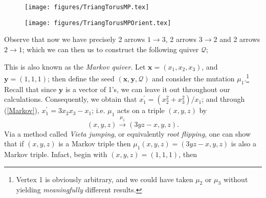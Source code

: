 \begin{figure}[!htb]
\centering
{}
\footnotesize
\texttt{[image: figures/TriangTorusMP.tex]}
\endminipage\hfill
{}
\centering
\footnotesize
{}
\endminipage\hfill
{}%
\footnotesize
\texttt{[image: figures/TriangTorusMPOrient.tex]}
\endminipage
\end{figure}
Observe that now we have precisely 2 arrows $1 \rightarrow 3$, 2 arrows $3 \rightarrow 2$ and 2 arrows $2 \rightarrow 1$; which we can then us to construct the following quiver $\mathcal{Q}$;
\begin{figure}[H]
    \centering
\end{figure}
This is also known as the \emph{Markov quiver}. Let $\mathbf{x} = (x_1,x_2,x_3)$, and $\mathbf{y} = (1,1,1)$; then define the seed $(\mathbf{x},\mathbf{y},\mathcal{Q})$ and consider the mutation $\mu_1$.\footnote{Vertex 1 is obviously arbitrary, and we could have taken $\mu_2$ or $\mu_3$ without yielding \emph{meaningfully} different results.} Recall that since $\mathbf{y}$ is a vector of 1's, we can leave it out throughout our calculations. Consequently, we obtain that $x_1^{'} = (x_2^2 + x_3^2)/x_1$; and through (\ref{Markov}), $x_1^{'} = 3x_2x_3 - x_1$; i.e. $\mu_1$ acts on a triple $(x,y,z)$ by 
\begin{equation}
    (x,y,z) \xrightarrow{\mu_1} (3yz-x,y,z).
\end{equation}
Via a method called \emph{Vieta jumping}, or equivalently \emph{root flipping}, one can show that if $(x,y,z)$ is a Markov triple then $\mu_1(x,y,z) = (3yz-x,y,z)$ is also a Markov triple. Infact, begin with $(x,y,z) = (1,1,1)$, then
